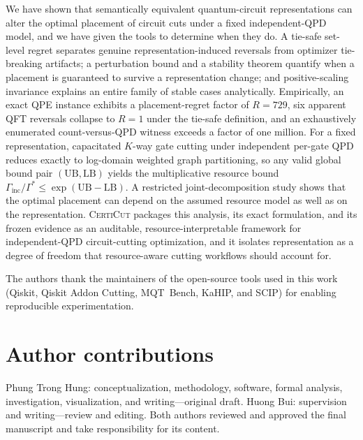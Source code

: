 \documentclass[
  aps,
  pra,
  reprint,
  amsmath,
  amssymb,
  longbibliography,
  nofootinbib,
  floatfix
]{revtex4-2}
\theoremstyle{plain}
\newcommand{\CertiCut}{\textsc{CertiCut}}
\newcommand{\LB}{\mathrm{LB}}
\newcommand{\UB}{\mathrm{UB}}
\begin{document}
We have shown that semantically equivalent quantum-circuit representations can alter the optimal placement of circuit cuts under a fixed independent-QPD model, and we have given the tools to determine when they do. A tie-safe set-level regret separates genuine representation-induced reversals from optimizer tie-breaking artifacts; a perturbation bound and a stability theorem quantify when a placement is guaranteed to survive a representation change; and positive-scaling invariance explains an entire family of stable cases analytically. Empirically, an exact QPE instance exhibits a placement-regret factor of $R=729$, six apparent QFT reversals collapse to $R=1$ under the tie-safe definition, and an exhaustively enumerated count-versus-QPD witness exceeds a factor of one million. For a fixed representation, capacitated $K$-way gate cutting under independent per-gate QPD reduces exactly to log-domain weighted graph partitioning, so any valid global bound pair $(\UB,\LB)$ yields the multiplicative resource bound $\Gamma_{\mathrm{inc}}/\Gamma^*\le\exp(\UB-\LB)$. A restricted joint-decomposition study shows that the optimal placement can depend on the assumed resource model as well as on the representation. \CertiCut{} packages this analysis, its exact formulation, and its frozen evidence as an auditable, resource-interpretable framework for independent-QPD circuit-cutting optimization, and it isolates representation as a degree of freedom that resource-aware cutting workflows should account for.

\begin{acknowledgments}
The authors thank the maintainers of the open-source tools used in this work (Qiskit, Qiskit Addon Cutting, MQT~Bench, KaHIP, and SCIP) for enabling reproducible experimentation.
\end{acknowledgments}

\section*{Author contributions}
Phung Trong Hung: conceptualization, methodology, software, formal analysis, investigation, visualization, and writing---original draft. Huong Bui: supervision and writing---review and editing. Both authors reviewed and approved the final manuscript and take responsibility for its content.
\end{document}
